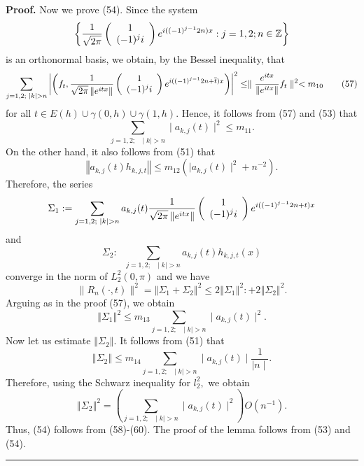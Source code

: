 \documentclass{article}%
\newenvironment{proof}[1][Proof]{\textbf{#1.} }{\ \rule{0.5em}{0.5em}}
\begin{document}
\begin{proof}
Now we prove (54). Since the system
\[
\left\{  \frac{1}{\sqrt{2\pi}}\left(
\begin{array}
[c]{c}%
1\\
(-1)^{j}i
\end{array}
\right)  e^{i((-1)^{j-1}2n)x}:j=1,2;n\in\mathbb{Z}\right\}
\]
is an orthonormal basis, we obtain, by the Bessel inequality, that
\begin{equation}
\sum_{j=1,2;\text{ }\mid k\mid>n}\left\vert \left(  f_{t},\frac{1}{\sqrt{2\pi
}\left\Vert e^{itx}\right\Vert }\left(
\begin{array}
[c]{c}%
1\\
(-1)^{j}i
\end{array}
\right)  e^{i((-1)^{j-1}2n+\overline{t})x}\right)  \right\vert ^{2}%
\leq\parallel\frac{e^{itx}}{\left\Vert e^{itx}\right\Vert }f_{t}\parallel
^{2}<m_{10} \tag{57}%
\end{equation}
for all $t\in E(h)\cup\gamma(0,h)\cup\gamma(1,h).$ Hence, it follows from (57)
and (53) that
\[
\sum_{j=1,2;\text{ }\mid k\mid>n}\mid a_{k,j}(t)\mid^{2}\leq m_{11}.
\]
On the other hand, it also follows from (51) that
\[
\left\Vert a_{k,j}(t)h_{k,j,t}\right\Vert \leq m_{12}(\mid a_{k,j}(t)\mid
^{2}+n^{-2}).
\]
Therefore, the series
\[
\Sigma_{1}:=\sum_{j=1,2;\text{ }\mid k\mid>n}a_{k,j}(t)\frac{1}{\sqrt{2\pi
}\left\Vert e^{itx}\right\Vert }\left(
\begin{array}
[c]{c}%
1\\
(-1)^{j}i
\end{array}
\right)  e^{i((-1)^{j-1}2n+t)x}%
\]
and
\[
\Sigma_{2}:\text{ }\sum_{j=1,2;\text{ }\mid k\mid>n}a_{k,j}(t)h_{k,j,t}(x)
\]
converge in the norm of $L_{2}^{2}(0,\pi)$ and we have
\begin{equation}
\parallel R_{n}(\cdot,t)\parallel^{2}=\left\Vert \Sigma_{1}+\Sigma
_{2}\right\Vert ^{2}\leq2\left\Vert \Sigma_{1}\right\Vert ^{2}:+2\left\Vert
\Sigma_{2}\right\Vert ^{2}. \tag{58}%
\end{equation}
Arguing as in the proof (57), we obtain
\begin{equation}
\left\Vert \Sigma_{1}\right\Vert ^{2}\leq m_{13}\sum_{j=1,2;\text{ }\mid
k\mid>n}\mid a_{k,j}(t)\mid^{2}. \tag{59}%
\end{equation}
Now let us estimate $\left\Vert \Sigma_{2}\right\Vert .$ It follows from (51)
that
\[
\left\Vert \Sigma_{2}\right\Vert \leq m_{14}\sum_{j=1,2;\text{ }\mid k\mid
>n}\mid a_{k,j}(t)\mid\frac{1}{\mid n\mid}.
\]
Therefore, using the Schwarz inequality for $l_{2}^{2},$ we obtain
\begin{equation}
\left\Vert \Sigma_{2}\right\Vert ^{2}=\left(  \sum_{j=1,2;\text{ }\mid
k\mid>n}\mid a_{k,j}(t)\mid^{2}\right)  O(n^{-1}). \tag{60}%
\end{equation}
Thus, (54) follows from (58)-(60). The proof of the lemma follows from (53)
and (54).
\end{proof}
\end{document}
